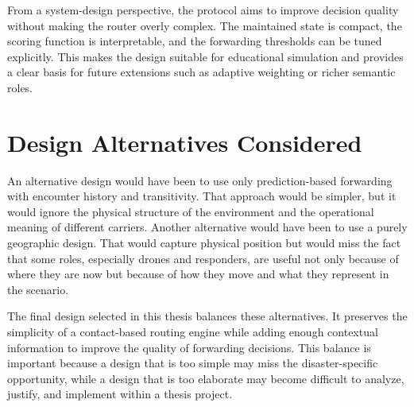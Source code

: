 From a system-design perspective, the protocol aims to improve decision quality without making the router overly complex. The maintained state is compact, the scoring function is interpretable, and the forwarding thresholds can be tuned explicitly. This makes the design suitable for educational simulation and provides a clear basis for future extensions such as adaptive weighting or richer semantic roles.

\section{Design Alternatives Considered}
An alternative design would have been to use only prediction-based forwarding with encounter history and transitivity. That approach would be simpler, but it would ignore the physical structure of the environment and the operational meaning of different carriers. Another alternative would have been to use a purely geographic design. That would capture physical position but would miss the fact that some roles, especially drones and responders, are useful not only because of where they are now but because of how they move and what they represent in the scenario.

The final design selected in this thesis balances these alternatives. It preserves the simplicity of a contact-based routing engine while adding enough contextual information to improve the quality of forwarding decisions. This balance is important because a design that is too simple may miss the disaster-specific opportunity, while a design that is too elaborate may become difficult to analyze, justify, and implement within a thesis project.
